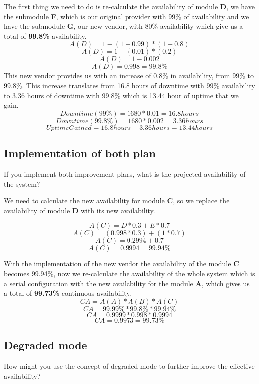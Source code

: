 \pagebreak
\noindent
The first thing we need to do is re-calculate the availability of 
module \textbf{D}, we have the submodule \textbf{F}, which is our original 
provider with 99\% of availability and we have the submodule \textbf{G}, our new 
vendor, with 80\% availability which give us a total of 
\textbf{99.8\%} availability.
\[ A(D) = 1 - (1 - 0.99) * (1 - 0.8) \]
\[ A(D) = 1 - (0.01) * (0.2) \]
\[ A(D) = 1 - 0.002 \]
\[ A(D) = 0.998 = 99.8\% \]
\noindent
This new vendor provides us with an increase of 0.8\% in availability, from 99\% 
to 99.8\%. This increase translates from 16.8 hours of downtime with 99\% availability
to 3.36 hours of downtime with 99.8\% which is 13.44 hour of uptime that we gain.
\[ Downtime(99\%) = 1680 * 0.01 = 16.8 hours\]
\[ Downtime(99.8\%) = 1680 * 0.002 = 3.36 hours\]
\[ Uptime Gained = 16.8 hours - 3.36 hours = 13.44 hours\]


\pagebreak

\subsection{Implementation of both plan}
If you implement both improvement plans, what is the projected 
availability of the system?\newline

\noindent
We need to calculate the new availability for module \textbf{C}, so we 
replace the availability of module \textbf{D} with its new availability.

\[ A(C) = D * 0.3 + E * 0.7 \]
\[ A(C) = (0.998 * 0.3) + (1 * 0.7) \]
\[ A(C) =  0.2994 + 0.7 \]
\[ A(C) =  0.9994 = 99.94\% \]

\noindent
With the implementation of the new vendor the availability of the 
module \textbf{C} becomes 99.94\%, now we re-calculate the availability of the 
whole system which is a serial configuration with the new availability for the 
module \textbf{A}, which gives us a total of \textbf{99.73\%} 
continuous availability.
\[ CA = A(A) * A(B) * A(C) \]
\[ CA =  99.99\% * 99.8\% * 99.94\%\]
\[ CA =  0.9999 * 0.998 * 0.9994\]
\[ CA = 0.9973 = 99.73\%\]

\pagebreak

\subsection{Degraded mode}
How might you use the concept of degraded mode to further improve the 
effective availability?\newline

